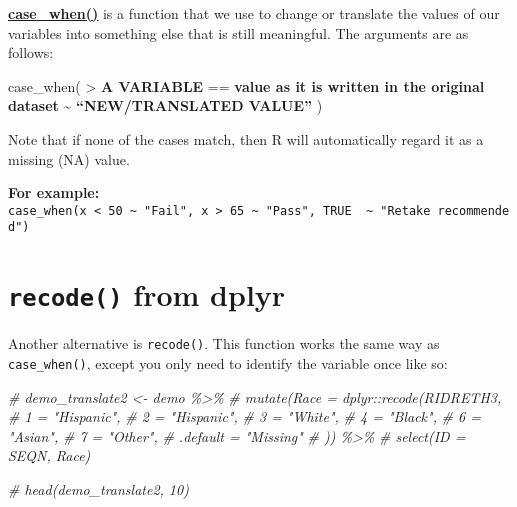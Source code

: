 \documentclass[
]{book}
\newenvironment{Shaded}{\begin{snugshade}}{\end{snugshade}}
\newcommand{\CommentTok}[1]{\textcolor[rgb]{0.56,0.35,0.01}{\textit{#1}}}
\begin{document}
\textbf{\href{https://dplyr.tidyverse.org/reference/case_when.html}{case\_when()}} is a function that we use to change or translate the values of our variables into something else that is still meaningful. The arguments are as follows:

case\_when(
\textgreater{} \textbf{A VARIABLE} == \textbf{value as it is written in the original dataset} \textasciitilde{} \textbf{``NEW/TRANSLATED VALUE''}
)

Note that if none of the cases match, then R will automatically regard it as a missing (NA) value.

\textbf{For example:} \texttt{case\_when(x\ \textless{}\ 50\ \textasciitilde{}\ "Fail",\ x\ \textgreater{}\ 65\ \textasciitilde{}\ "Pass",\ TRUE\ \ \textasciitilde{}\ "Retake\ recommended")}

\hypertarget{recode-from-dplyr}{%
\section{\texorpdfstring{\texttt{recode()} from dplyr}{recode() from dplyr}}\label{recode-from-dplyr}}

Another alternative is \texttt{recode()}. This function works the same way as \texttt{case\_when()}, except you only need to identify the variable once like so:

\begin{Shaded}
\begin{Highlighting}[]
\CommentTok{\# demo\_translate2 \textless{}{-} demo \%\textgreater{}\%}
\CommentTok{\#     mutate(Race = dplyr::recode(RIDRETH3,}
\CommentTok{\#            \textasciigrave{}1\textasciigrave{} = "Hispanic",}
\CommentTok{\#            \textasciigrave{}2\textasciigrave{} = "Hispanic",}
\CommentTok{\#            \textasciigrave{}3\textasciigrave{} = "White",}
\CommentTok{\#            \textasciigrave{}4\textasciigrave{} = "Black",}
\CommentTok{\#            \textasciigrave{}6\textasciigrave{} = "Asian",}
\CommentTok{\#            \textasciigrave{}7\textasciigrave{} = "Other",}
\CommentTok{\#           .default = "Missing"}
\CommentTok{\#     )) \%\textgreater{}\%}
\CommentTok{\#     select(ID = SEQN, Race)}
\end{Highlighting}
\end{Shaded}

\begin{Shaded}
\begin{Highlighting}[]
\CommentTok{\# head(demo\_translate2, 10)}
\end{Highlighting}
\end{Shaded}
\end{document}
